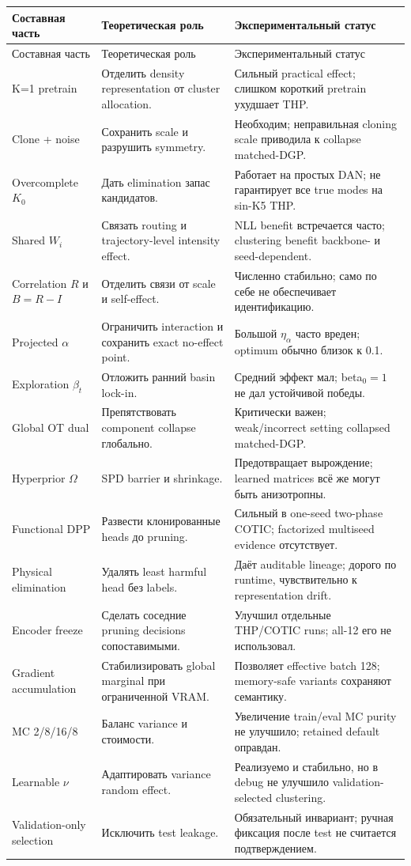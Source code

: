 \documentclass[11pt,a4paper]{article}
\begin{document}
\begin{longtable}{p{}p{}p{}}
\toprule
Составная часть & Теоретическая роль & Экспериментальный статус \\
\midrule
\endfirsthead
\toprule
Составная часть & Теоретическая роль & Экспериментальный статус \\
\midrule
\endhead
K=1 pretrain & Отделить density representation от cluster allocation. & Сильный practical effect; слишком короткий pretrain ухудшает THP. \\
Clone + noise & Сохранить scale и разрушить symmetry. & Необходим; неправильная cloning scale приводила к collapse matched-DGP. \\
Overcomplete $K_0$ & Дать elimination запас кандидатов. & Работает на простых DAN; не гарантирует все true modes на sin-K5 THP. \\
Shared $W_i$ & Связать routing и trajectory-level intensity effect. & NLL benefit встречается часто; clustering benefit backbone- и seed-dependent. \\
Correlation $R$ и $B=R-I$ & Отделить связи от scale и self-effect. & Численно стабильно; само по себе не обеспечивает идентификацию. \\
Projected $\alpha$ & Ограничить interaction и сохранить exact no-effect point. & Большой $\eta_\alpha$ часто вреден; optimum обычно близок к 0.1. \\
Exploration $\beta_t$ & Отложить ранний basin lock-in. & Средний эффект мал; beta$_0=1$ не дал устойчивой победы. \\
Global OT dual & Препятствовать component collapse глобально. & Критически важен; weak/incorrect setting collapsed matched-DGP. \\
Hyperprior $\Omega$ & SPD barrier и shrinkage. & Предотвращает вырождение; learned matrices всё же могут быть анизотропны. \\
Functional DPP & Развести клонированные heads до pruning. & Сильный в one-seed two-phase COTIC; factorized multiseed evidence отсутствует. \\
Physical elimination & Удалять least harmful head без labels. & Даёт auditable lineage; дорого по runtime, чувствительно к representation drift. \\
Encoder freeze & Сделать соседние pruning decisions сопоставимыми. & Улучшил отдельные THP/COTIC runs; all-12 его не использовал. \\
Gradient accumulation & Стабилизировать global marginal при ограниченной VRAM. & Позволяет effective batch 128; memory-safe variants сохраняют семантику. \\
MC 2/8/16/8 & Баланс variance и стоимости. & Увеличение train/eval MC purity не улучшило; retained default оправдан. \\
Learnable $\nu$ & Адаптировать variance random effect. & Реализуемо и стабильно, но в debug не улучшило validation-selected clustering. \\
Validation-only selection & Исключить test leakage. & Обязательный инвариант; ручная фиксация после test не считается подтверждением. \\
\bottomrule
\end{longtable}
\end{document}
